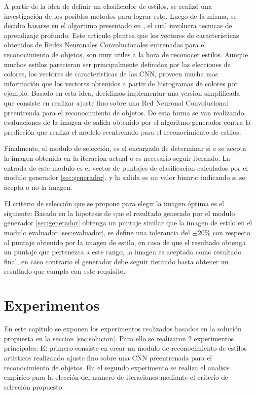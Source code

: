 \documentclass[a4paper,11pt,spanish]{book}
\begin{document}
    A partir de la idea de definir un clasificador de estilos, se realizó una investigación de los posibles metodos para lograr esto.
    Luego de la misma, se decidio basarse en el algortimo presentado en \cite{Karayev:Style_Recognition}, el cual involucra tecnicas de aprendizaje profundo.
    Este articulo plantea que los vectores de caracteristicas obtenidos de Redes Neuronales Convolucionales entrenadas para el reconocimiento de objetos, son muy utiles a la hora de
    reconocer estilos. Aunque muchos estilos parecieran ser principalmente definidos por las elecciones de colores, los vectores de caracteristicas de las CNN, proveen mucha mas información
    que los vectores obtenidos a partir de histogramas de colores por ejemplo.
    Basado en esta idea, decidimos implementar una version simplificada que consiste en realizar ajuste fino sobre una Red Neuronal Convolucional preentrenda para el reconocimiento de objetos.
    De esta forma se van realizando evaluaciones de la imagen de salida obtenido por el algoritmo generador contra la predicción que realiza el modelo reentrenado para el reconocimiento de estilos.

    Finalmente, el modulo de selección, es el encargado de determinar si e se acepta la imagen obtenida en la iteracion actual o es necesario seguir iterando. 
    La entrada de este modulo es el vector de puntajes de clasificacion calculados por el modulo generador \ref{sec:generador}, y la salida es un valor binario indicando si se acepta o no la imagen.
    
    El criterio de selección que se propone para elegir la imagen óptima es el siguiente:
    Basado en la hipotesis de que el resultado generado por el modulo generador \ref{sec:generador} obtenga un puntaje similar que la imagen de estilo en el modulo evaluador
    \ref{sec:evaluador}, se define una tolerancia del $\pm 20\%$ con respecto al puntaje obtenido por la imagen de estilo, en caso de que el resultado obtenga un puntaje que pertenezca
    a este rango, la imagen es aceptada como resultado final, en caso contrario el generador debe seguir iterando hasta obtener un resultado que cumpla con este requisito.


\chapter{Experimentos}
 En este capitulo se exponen los experimentos realizados basados en la solución propuesta en la seccion \ref{sec:solucion}.
 Para ello se realizaron 2 experimentos principales: El primero consiste en crear un modulo de reconocimiento de estilos artisticos realizando ajuste fino sobre una CNN preentrenada
 para el reconocimiento de objetos. En el segundo experimento se realiza el analisis empirico para la elección del numero de iteraciones mediante el criterio de selección propuesto.
\end{document}
